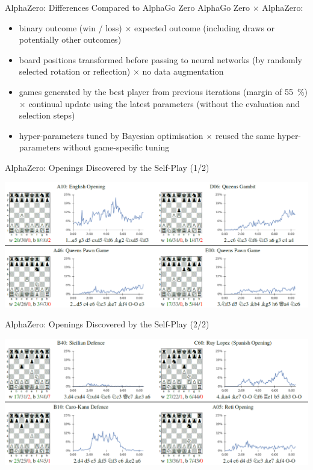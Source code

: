\documentclass{beamer}
\begin{document}
  {

    \begin{frame}{AlphaZero: Differences Compared to AlphaGo Zero}
      AlphaGo Zero $\times$ \alert{AlphaZero}:
      \pause
      \begin{itemize}[<+->]
        \item binary outcome (win / loss) $\times$ \alert{expected outcome (including draws or potentially other outcomes)}
        \item board positions transformed before passing to neural networks (by randomly selected rotation or reflection) $\times$ \alert{no data augmentation}
        \item games generated by the best player from previous iterations (margin of 55~\%) $\times$ \alert{continual update using the latest parameters (without the evaluation and selection steps)}
        \item hyper-parameters tuned by Bayesian optimisation $\times$ \alert{reused the same hyper-parameters without game-specific tuning}
      \end{itemize}
    \end{frame}

    \begin{frame}{AlphaZero: Openings Discovered by the Self-Play (1/2)}
      \begin{center}
        \includegraphics[width=\textwidth]{../img/AlphaZero-paper/openings-1.png}
      \end{center}
    \end{frame}

    \begin{frame}{AlphaZero: Openings Discovered by the Self-Play (2/2)}
      \begin{center}
        \includegraphics[width=\textwidth]{../img/AlphaZero-paper/openings-2.png}
      \end{center}
    \end{frame}

}
\end{document}
